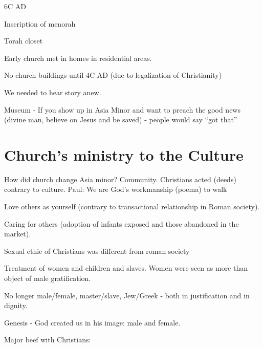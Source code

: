 \documentclass[
]{book}
\begin{document}
6C AD

Inscription of menorah

Torah closet

Early church met in homes in residential areas.

No church buildings until 4C AD (due to legalization of Christianity)

We needed to hear story anew.

Museum - If you show up in Asia Minor and want to preach the good news (divine man, believe on Jesus and be saved) - people would say ``got that''

\hypertarget{churchs-ministry-to-the-culture}{%
\section{Church's ministry to the Culture}\label{churchs-ministry-to-the-culture}}

How did church change Asia minor? Community. Christians acted (deeds) contrary to culture. Paul: We are God's workmanship (poema) to walk

Love others as yourself (contrary to transactional relationship in Roman society).

Caring for others (adoption of infants exposed and those abandoned in the market).

Sexual ethic of Christians was different from roman society

Treatment of women and children and slaves. Women were seen as more than object of male gratification.

No longer male/female, master/slave, Jew/Greek - both in justification and in dignity.

Genesis - God created us in his image: male and female.

Major beef with Christians:
\end{document}
